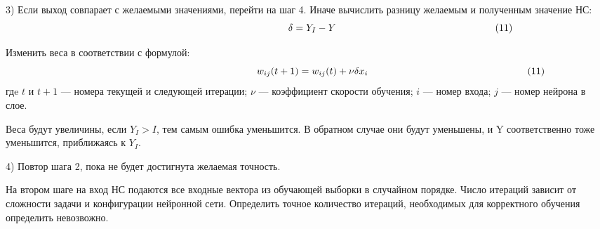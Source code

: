 \documentclass[a4paper,english,russian]{G2-105}
\begin{document}
\par 3) Если выход совпарает с желаемыми значениями, перейти на шаг 4.
Иначе вычислить разницу желаемым и полученным значение НС:
\[
\ \hspace*{66mm} \delta=Y_I-Y \ \hspace*{56mm} (11)
\] 
\par Изменить веса в соответствии с формулой:
\[
\ \hspace*{66mm} w_{ij}(t+1)=w_{ij}(t)+\nu        \delta x_i \ \hspace*{56mm} (11)
\]
гдe $t$ и $t+1$ --- номера текущей и следующей итерации; $\nu$ --- коэффициент скорости обучения; $i$ --- номер входа; $j$ --- номер нейрона в слое.
\par Веса будут увеличины, если $Y_I>I$, тем самым ошибка уменьшится. В обратном случае они будут уменьшены, и Y соответственно тоже уменьшится, приближаясь к $Y_I$.
\par 4) Повтор шага 2, пока не будет достигнута желаемая точность.
\par На втором шаге на вход НС подаются все входные вектора из обучающей выборки в случайном порядке. Число итераций зависит от сложности задачи и конфигурации нейронной сети. Определить точное количество итераций, необходимых для корректного обучения определить невозвожно. 
\end{document}
